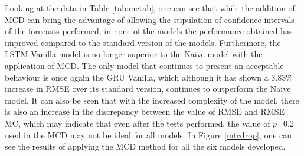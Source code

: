\begin{table}[htbp]
  \centering
  \small
  \caption{Standard Dropout vs Monte Carlo Dropout results.}
  \label{tab:mctab}%
\end{table}%

Looking at the data in Table \ref{tab:mctab}, one can see that while the addition of \ac{MCD} can bring the advantage of allowing the stipulation of confidence intervals of the forecasts performed, in none of the models the performance obtained has improved compared to the standard version of the models. Furthermore, the \ac{LSTM} Vanilla model is no longer superior to the Naive model with the application of \ac{MCD}. The only model that continues to present an acceptable behaviour is once again the \ac{GRU} Vanilla, which although it has shown a 3.83\% increase in \ac{RMSE} over its standard version, continues to outperform the Naive model. It can also be seen that with the increased complexity of the model, there is also an increase in the discrepancy between the value of \ac{RMSE} and \ac{RMSE} MC, which may indicate that even after the tests performed, the value of $p$=0.2 used in the \ac{MCD} may not be ideal for all models. In Figure \ref{mtcdrop}, one can see the results of applying the \ac{MCD} method for all the six models developed.

